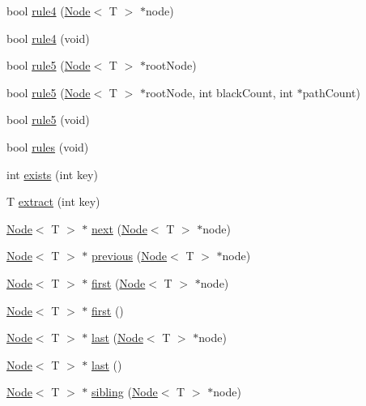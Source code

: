 \begin{DoxyCompactItemize}
\item 
bool \hyperlink{class_r_b_tree_a140f3511962683d74d040f726d8554d4}{rule4} (\hyperlink{class_node}{Node}$<$ T $>$ $\ast$node)
\item 
bool \hyperlink{class_r_b_tree_acc448bf2bc24f8fdb83d293dca4f4810}{rule4} (void)
\item 
bool \hyperlink{class_r_b_tree_a8a776aabd7e674ad2cb97e9b67abcaad}{rule5} (\hyperlink{class_node}{Node}$<$ T $>$ $\ast$root\+Node)
\item 
bool \hyperlink{class_r_b_tree_ae3e4ffd3d8b99d79daec0e95ed443bfe}{rule5} (\hyperlink{class_node}{Node}$<$ T $>$ $\ast$root\+Node, int black\+Count, int $\ast$path\+Count)
\item 
bool \hyperlink{class_r_b_tree_ad37bc2fd3c7b14c5d49862d4a3377b76}{rule5} (void)
\item 
bool \hyperlink{class_r_b_tree_a81a8300e35c048934b586935223abaff}{rules} (void)
\item 
int \hyperlink{class_r_b_tree_a9a006660b7780a180fc87f2f8c89d1c9}{exists} (int key)
\item 
T \hyperlink{class_r_b_tree_ac21009120411c393b499893d6874370c}{extract} (int key)
\item 
\hyperlink{class_node}{Node}$<$ T $>$ $\ast$ \hyperlink{class_r_b_tree_a5c8cbef68755a4029cc2af88fd7f5d9f}{next} (\hyperlink{class_node}{Node}$<$ T $>$ $\ast$node)
\item 
\hyperlink{class_node}{Node}$<$ T $>$ $\ast$ \hyperlink{class_r_b_tree_ac7a8ea33e99ba8dfcc8379a18e44da7f}{previous} (\hyperlink{class_node}{Node}$<$ T $>$ $\ast$node)
\item 
\hyperlink{class_node}{Node}$<$ T $>$ $\ast$ \hyperlink{class_r_b_tree_a920561ef98e659233f743817a4780946}{first} (\hyperlink{class_node}{Node}$<$ T $>$ $\ast$node)
\item 
\hyperlink{class_node}{Node}$<$ T $>$ $\ast$ \hyperlink{class_r_b_tree_a69b25e832b54c369c3d4bb84bad9bf71}{first} ()
\item 
\hyperlink{class_node}{Node}$<$ T $>$ $\ast$ \hyperlink{class_r_b_tree_ad559890dcf3ef921173e63da2fdb0a22}{last} (\hyperlink{class_node}{Node}$<$ T $>$ $\ast$node)
\item 
\hyperlink{class_node}{Node}$<$ T $>$ $\ast$ \hyperlink{class_r_b_tree_ab381a71f2306578d907f31b408da0761}{last} ()
\item 
\hyperlink{class_node}{Node}$<$ T $>$ $\ast$ \hyperlink{class_r_b_tree_a6385e8c4d17abbd7050e53776075c26b}{sibling} (\hyperlink{class_node}{Node}$<$ T $>$ $\ast$node)
\item 

\end{DoxyCompactItemize}
